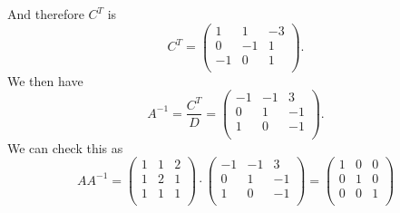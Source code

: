 And therefore $C^{T}$ is
\[ 
C^{T} = \begin{pmatrix}
1 & 1 & -3\\
0 & -1 & 1\\
-1 & 0 & 1\\
\end{pmatrix}
.\]
We then have
\[ 
A^{-1} = \frac{C^{T}}{D} = \begin{pmatrix}
-1 & -1 & 3\\
0 & 1 & -1\\
1 & 0 & -1\\
\end{pmatrix}
.\]
We can check this as
\[ 
A A^{-1} = \begin{pmatrix}1 & 1 & 2\\1 & 2 & 1\\1 & 1 & 1\\\end{pmatrix} \cdot \begin{pmatrix}-1 & -1 & 3\\0 & 1 & -1\\1 & 0 & -1\\\end{pmatrix} = \left(\begin{array}{ccc} 1 & 0 & 0 \\ 0 & 1 & 0 \\ 0 & 0 & 1 \\\end{array}\right)
\]
